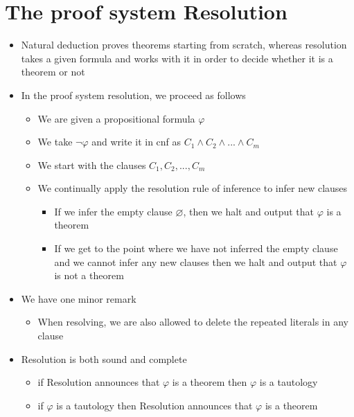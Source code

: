 \documentclass{article}[18pt]
\begin{document}
\section{The proof system Resolution}
\begin{itemize}
	\item Natural deduction proves theorems starting from scratch, whereas resolution takes a given formula and works with it in order to decide whether it is a theorem or not
	\item In the proof system resolution, we proceed as follows
	\begin{itemize}
		\item We are given a propositional formula $\varphi$
		\item We take $\lnot\varphi$ and write it in cnf as $C_1\land C_2\land...\land C_m$
		\item We start with the clauses $C_1,C_2,...,C_m$
		\item We continually apply the resolution rule of inference to infer new clauses
		\begin{itemize}
			\item If we infer the empty clause $\varnothing$, then we halt and output that $\varphi$ is a theorem
			\item If we get to the point where we have not inferred the empty clause and we cannot infer any new clauses then we halt and output that $\varphi$ is not a theorem
		\end{itemize}
	\end{itemize}
	\item We have one minor remark
	\begin{itemize}
		\item When resolving, we are also allowed to delete the repeated literals in any clause
	\end{itemize}
	\item Resolution is both sound and complete
	\begin{itemize}
		\item if Resolution announces that $\varphi$ is a theorem then $\varphi$ is a tautology
		\item if $\varphi$ is a tautology then Resolution announces that $\varphi$ is a theorem
	\end{itemize}
\end{itemize}
\end{document}
